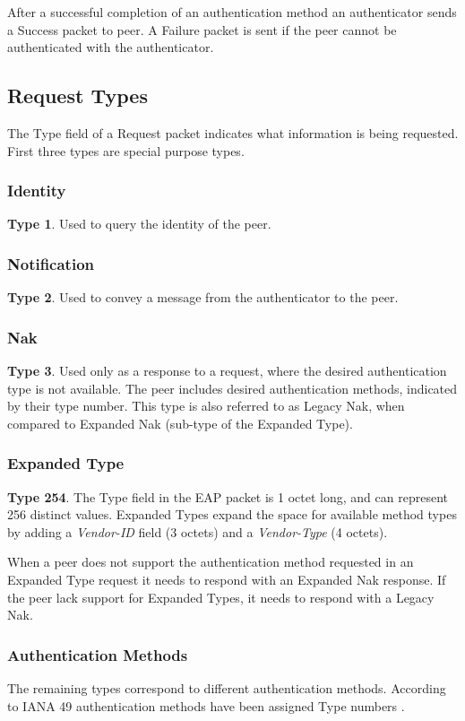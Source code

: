 After a successful completion of an authentication method an authenticator sends a Success packet to peer. A Failure packet is sent if the peer cannot be authenticated with the authenticator.


\subsection{Request Types}

The Type field of a Request packet indicates what information is being requested. First three types are special purpose types.

\subsubsection{Identity} \textbf{Type 1}. Used to query the identity of the peer.

\subsubsection{Notification} \textbf{Type 2}. Used to convey a message from the authenticator to the peer.

\subsubsection{Nak} \textbf{Type 3}. Used only as a response to a request, where the desired authentication type is not available.
The peer includes desired authentication methods, indicated by their type number.
This type is also referred to as Legacy Nak, when compared to Expanded Nak (sub-type of the Expanded Type).

\subsubsection{Expanded Type} \textbf{Type 254}. The Type field in the EAP packet is 1 octet long, and can represent 256 distinct values.
Expanded Types expand the space for available method types by adding a \textit{Vendor-ID} field (3 octets) and a \textit{Vendor-Type} (4 octets).

When a peer does not support the authentication method requested in an Expanded Type request it needs to respond with an Expanded Nak response. 
If the peer lack support for Expanded Types, it needs to respond with a Legacy Nak.

\subsubsection{Authentication Methods}
The remaining types correspond to different authentication methods.
According to IANA 49 authentication methods have been assigned Type numbers \cite{joseph2004eap}.

